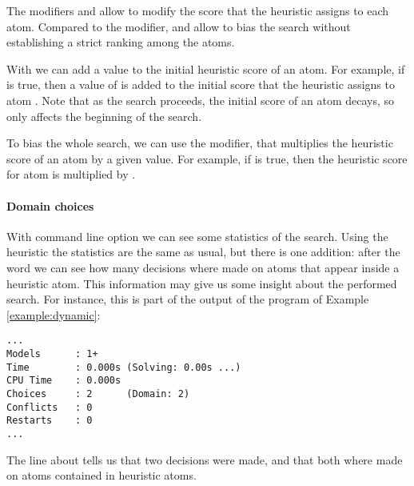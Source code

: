The modifiers  and  allow to 
modify the score that the  heuristic assigns to each atom.
Compared to the  modifier, 
 and  allow to bias the search without establishing a strict ranking among the atoms.

With  we can add a value to the initial heuristic score of an atom.
For example, if  is true, then a value of  is added to
the initial score that the heuristic assigns to atom .
Note that as the search proceeds, the initial score of an atom decays, 
so  only affects the beginning of the search.

To bias the whole search, we can use the  modifier,
that multiplies the heuristic score of an atom by a given value.
For example, if  is true, 
then the heuristic score for atom  is multiplied by .

\paragraph{Domain choices}

With command line option  we can see some statistics of the search.
Using the  heuristic
the statistics are the same as usual, but there is one addition: 
after the word  we can see how many decisions where made on atoms 
that appear inside a heuristic atom.
This information may give us some insight about the performed search.
For instance, this is part of the output of the program of Example \ref{example:dynamic}:
\begin{lstlisting}[numbers=none]
...
Models      : 1+
Time        : 0.000s (Solving: 0.00s ...)
CPU Time    : 0.000s
Choices     : 2      (Domain: 2)
Conflicts   : 0
Restarts    : 0
...
\end{lstlisting}
The line about  tells us that  two decisions were made, 
and that both where made on atoms contained in heuristic atoms.



